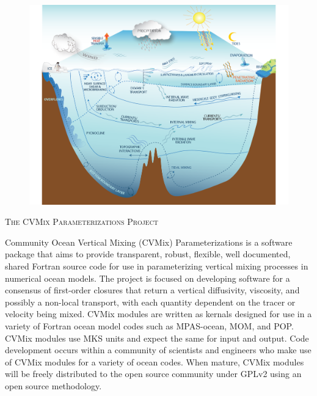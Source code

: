 \documentclass[10pt]{book}
\begin{document}
\begin{figure}[ht]
\begin{center}
\vspace{1cm}
{\includegraphics[angle=0,width=14cm]{./figs/OceanProcSchem_revision3.png}}
\end{center}
\end{figure}



\thispagestyle{empty}
\newpage 

\begin{center}
{\scshape \Large The CVMix Parameterizations Project} 
\end{center}

{\sc Community Ocean Vertical Mixing (CVMix) Parameterizations} is a
software package that aims to provide transparent, robust, flexible,
well documented, shared Fortran source code for use in parameterizing
vertical mixing processes in numerical ocean models.  The project is
focused on developing software for a consensus of first-order closures
that return a vertical diffusivity, viscosity, and possibly a
non-local transport, with each quantity dependent on the tracer or
velocity being mixed.  CVMix modules are written as kernals designed
for use in a variety of Fortran ocean model codes such as MPAS-ocean,
MOM, and POP.  CVMix modules use MKS units and expect the same for
input and output.  Code development occurs within a community of
scientists and engineers who make use of CVMix modules for a variety
of ocean codes.  When mature, CVMix modules will be freely distributed
to the open source community under GPLv2 using an open source
methodology.
\end{document}
